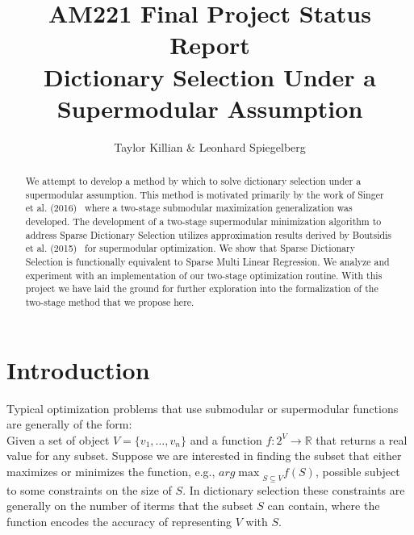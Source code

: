\documentclass{article}
\newcommand{\R}{\mathbb{R}}
\begin{document}
\title{AM221 Final Project Status Report \\ \large Dictionary Selection Under a Supermodular Assumption}
\author{Taylor Killian \& Leonhard Spiegelberg}
\maketitle

\begin{abstract}
We attempt to develop a method by which to solve dictionary selection under a supermodular assumption. This method is motivated primarily by the work of Singer et al. (2016)~\cite{Singer16TwoStage} where a two-stage submodular maximization generalization was developed. The development of a two-stage supermodular minimization algorithm to address Sparse Dictionary Selection utilizes approximation results derived by Boutsidis et al. (2015)~\cite{BoutsidisLS15} for supermodular optimization. We show that Sparse Dictionary Selection is functionally equivalent to Sparse Multi Linear Regression. We analyze and experiment with an implementation of our two-stage optimization routine. With this project we have laid the ground for further exploration into the formalization of the two-stage method that we propose here. 
\end{abstract}

\section{Introduction}\label{sec:intro}

\noindent Typical optimization problems that use submodular or supermodular functions are generally of the form:\\

\noindent Given a set of object $V=\{v_1,\ldots,v_n\}$ and a function $f:2^V\to \R$ that returns a real value for any subset. Suppose we are interested in finding the subset that either maximizes or minimizes the function, e.g., ${arg\max}_{S\subseteq V} f(S)$, possible subject to some constraints on the size of $S$. In dictionary selection these constraints are generally on the number of iterms that the subset $S$ can contain, where the function encodes the accuracy of representing $V$ with $S$.
\end{document}
